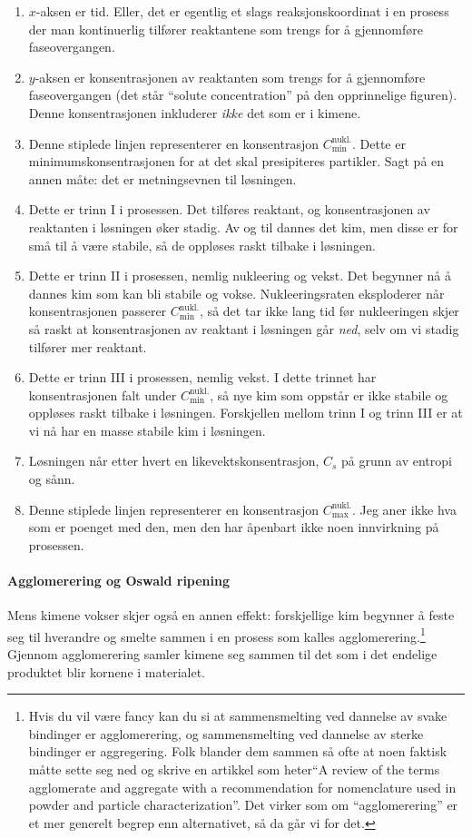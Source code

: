 \begin{enumerate}
	\item $x$-aksen er tid. Eller, det er egentlig et slags reaksjonskoordinat i en prosess der man kontinuerlig tilfører reaktantene som trengs for å gjennomføre faseovergangen.
	\item $y$-aksen er konsentrasjonen av reaktanten som trengs for å gjennomføre faseovergangen (det står ``solute concentration'' på den opprinnelige figuren). Denne konsentrasjonen inkluderer \emph{ikke} det som er i kimene.
	\item Denne stiplede linjen representerer en konsentrasjon $C_{\text{min}}^{\text{nukl.}}$. Dette er minimumskonsentrasjonen for at det skal presipiteres partikler. Sagt på en annen måte: det er metningsevnen til løsningen.
	\item Dette er trinn I i prosessen. Det tilføres reaktant, og konsentrasjonen av reaktanten i løsningen øker stadig. Av og til dannes det kim, men disse er for små til å være stabile, så de oppløses raskt tilbake i løsningen.
	\item Dette er trinn II i prosessen, nemlig nukleering og vekst. Det begynner nå å dannes kim som kan bli stabile og vokse. Nukleeringsraten eksploderer når konsentrasjonen passerer $C_{\text{min}}^{\text{nukl.}}$, så det tar ikke lang tid før nukleeringen skjer så raskt at konsentrasjonen av reaktant i løsningen går \emph{ned}, selv om vi stadig tilfører mer reaktant.
	\item Dette er trinn III i prosessen, nemlig vekst. I dette trinnet har konsentrasjonen falt under $C_{\text{min}}^{\text{nukl.}}$, så nye kim som oppstår er ikke stabile og oppløses raskt tilbake i løsningen. Forskjellen mellom trinn I og trinn III er at vi nå har en masse stabile kim i løsningen.
	\item Løsningen når etter hvert en likevektskonsentrasjon, $C_s$ på grunn av entropi og sånn.
	\item Denne stiplede linjen representerer en konsentrasjon $C_{\text{max}}^{\text{nukl.}}$. Jeg aner ikke hva som er poenget med den, men den har åpenbart ikke noen innvirkning på prosessen.
\end{enumerate}

\paragraph{Agglomerering og Oswald ripening} Mens kimene vokser skjer også en annen effekt: forskjellige kim begynner å feste seg til hverandre og smelte sammen i en prosess som kalles agglomerering.\footnote{Hvis du vil være fancy kan du si at sammensmelting ved dannelse av svake bindinger er agglomerering, og sammensmelting ved dannelse av sterke bindinger er aggregering. Folk blander dem sammen så ofte at noen faktisk måtte sette seg ned og skrive en artikkel som heter``A review of the terms agglomerate and aggregate with a recommendation for nomenclature used in powder and particle characterization''. Det virker som om ``agglomerering'' er et mer generelt begrep enn alternativet, så da går vi for det.} Gjennom agglomerering samler kimene seg sammen til det som i det endelige produktet blir kornene i materialet.


